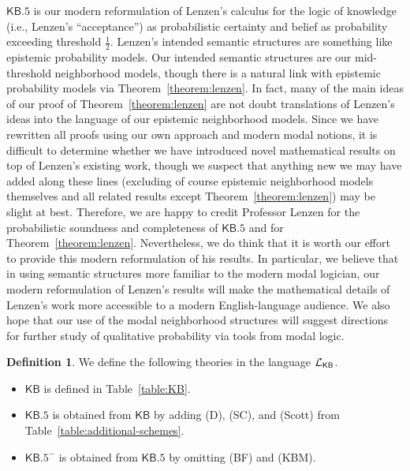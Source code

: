 \documentclass[12pt]{article}
\theoremstyle{definition}
\newtheorem{definition}[theorem]{Definition}
\newcommand{\Lang}{{\cal L}}   %
\newcommand{\KB}{{\mathsf{KB}}}                 %
\newcommand{\KBeq}{{\mathsf{KB.5}}}             %
\newcommand{\KBeqm}{{\mathsf{KB.5}}^{-}}        %
\begin{document}
$\KBeq$ is our modern reformulation of Lenzen's \cite{Lenzen1980:gwuw}
calculus for the logic of knowledge (i.e., Lenzen's ``acceptance'') as
probabilistic certainty and belief as probability exceeding threshold
$\frac 12$.  Lenzen's intended semantic structures are something like
epistemic probability models.  Our intended semantic structures are
our mid-threshold neighborhood models, though there is a natural link
with epistemic probability models via Theorem~\ref{theorem:lenzen}.
In fact, many of the main ideas of our proof of
Theorem~\ref{theorem:lenzen} are not doubt translations of Lenzen's
ideas into the language of our epistemic neighborhood models. Since we
have rewritten all proofs using our own approach and modern modal
notions, it is difficult to determine whether we have introduced novel
mathematical results on top of Lenzen's existing work, though we
suspect that anything new we may have added along these lines
(excluding of course epistemic neighborhood models themselves and all
related results except Theorem~\ref{theorem:lenzen}) may be slight at
best.  Therefore, we are happy to credit Professor Lenzen for the
probabilistic soundness and completeness of $\KBeq$ and for
Theorem~\ref{theorem:lenzen}.  Nevertheless, we do think that it is
worth our effort to provide this modern reformulation of his results.
In particular, we believe that in using semantic structures more
familiar to the modern modal logician, our modern reformulation of
Lenzen's results will make the mathematical details of Lenzen's work
more accessible to a modern English-language audience.  We also hope
that our use of the modal neighborhood structures will suggest
directions for further study of qualitative probability via tools from
modal logic.

\begin{definition}
  \label{definition:calculi}
  We define the following theories in the language $\Lang_\KB$.
  \begin{itemize}
  \item $\KB$ is defined in Table~\ref{table:KB}.

  \item $\KBeq$ is obtained from $\KB$ by adding (D), (SC), and (Scott)
    from Table~\ref{table:additional-schemes}.

  \item $\KBeqm$ is obtained from $\KBeq$ by omitting (BF) and (KBM).
  \end{itemize}
\end{definition}
\end{document}
